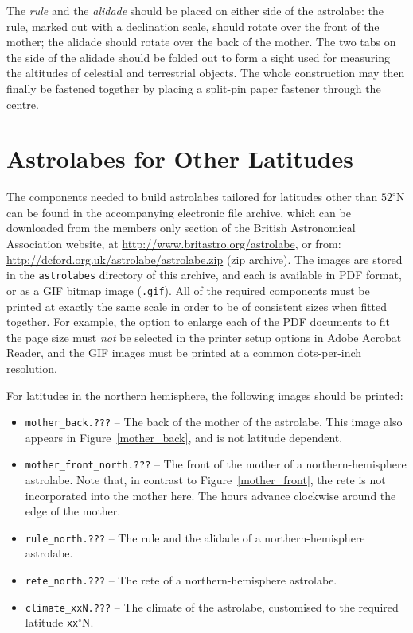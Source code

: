 \documentclass[a4paper,onecolumn,10pt]{article}
\begin{document}
The {\it rule} and the {\it alidade} should be placed on either side of the
astrolabe: the rule, marked out with a declination scale, should rotate over
the front of the mother; the alidade should rotate over the back of the mother.
The two tabs on the side of the alidade should be folded out to form a sight
used for measuring the altitudes of celestial and terrestrial objects.  The
whole construction may then finally be fastened together by placing a split-pin
paper fastener through the centre.

\section*{Astrolabes for Other Latitudes}

The components needed to build astrolabes tailored for latitudes other than
$52^\circ$N can be found in the accompanying electronic file archive, which can
be downloaded from the members only section of the British Astronomical
Association website, at
\vspace{1mm}\newline\noindent
\url{http://www.britastro.org/astrolabe},
or from:
\vspace{1mm}\newline\noindent
\url{http://dcford.org.uk/astrolabe/astrolabe.zip} (zip archive).
\vspace{1mm}\newline\noindent
The images are stored in the {\tt astrolabes} directory of this archive, and
each is available in PDF format, or as a GIF bitmap image ({\tt .gif}).  All of
the required components must be printed at exactly the same scale in order to
be of consistent sizes when fitted together. For example, the option to enlarge
each of the PDF documents to fit the page size must {\it not} be selected in
the printer setup options in Adobe Acrobat Reader, and the GIF images must be
printed at a common dots-per-inch resolution.

For latitudes in the northern hemisphere, the following images should be
printed:
\begin{itemize}
\item {\tt mother\_back.???} -- The back of the mother of the astrolabe. This image also appears in Figure~\ref{mother_back}, and is not latitude dependent.
\item {\tt mother\_front\_north.???} -- The front of the mother of a northern-hemi\-sp\-here astrolabe. Note that, in contrast to Figure~\ref{mother_front}, the rete is not incorporated into the mother here. The hours advance clockwise around the edge of the mother.
\item {\tt rule\_north.???} -- The rule and the alidade of a northern-hemisphere astrolabe.
\item {\tt rete\_north.???} -- The rete of a northern-hemisphere astrolabe.
\item{\tt climate\_xxN.???} -- The climate of the astrolabe, customised to the required latitude {\tt xx}$^\circ$N.
\end{itemize}
\end{document}
